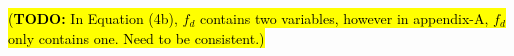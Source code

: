 \documentclass[journal]{IEEEtran}
\newcommand{\todoQ}[1]{\vspace{0px} %
	\todo[inline, color=orange!50]{\textbf{[Note:]} {#1}} %
}
\newcommand{\todohere}[1]{\hl{(\textbf{TODO:} #1)}}
\begin{document}
	\todohere{In Equation (4b), $f_d$ contains two variables, however in appendix-A, $f_d$ only contains one. Need to be consistent.}
	
\end{document}
